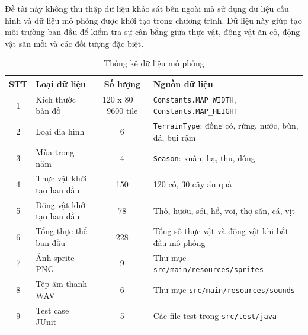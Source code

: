 \documentclass[12pt,a4paper]{article}
\begin{document}
Đề tài này không thu thập dữ liệu khảo sát bên ngoài mà sử dụng dữ liệu cấu hình và dữ liệu mô phỏng được khởi tạo trong chương trình. Dữ liệu này giúp tạo môi trường ban đầu để kiểm tra sự cân bằng giữa thực vật, động vật ăn cỏ, động vật săn mồi và các đối tượng đặc biệt.

\begin{table}[H]
    \centering
    \caption{Thống kê dữ liệu mô phỏng}
    \begin{tabular}{|c|p{5cm}|c|p{5cm}|}
        \hline
        \textbf{STT} & \textbf{Loại dữ liệu} & \textbf{Số lượng} & \textbf{Nguồn dữ liệu} \\
        \hline
        1 & Kích thước bản đồ & 120 x 80 = 9600 tile & \texttt{Constants.MAP\_WIDTH}, \texttt{Constants.MAP\_HEIGHT} \\
        \hline
        2 & Loại địa hình & 6 & \texttt{TerrainType}: đồng cỏ, rừng, nước, bùn, đá, bụi rậm \\
        \hline
        3 & Mùa trong năm & 4 & \texttt{Season}: xuân, hạ, thu, đông \\
        \hline
        4 & Thực vật khởi tạo ban đầu & 150 & 120 cỏ, 30 cây ăn quả \\
        \hline
        5 & Động vật khởi tạo ban đầu & 78 & Thỏ, hươu, sói, hổ, voi, thợ săn, cá, vịt \\
        \hline
        6 & Tổng thực thể ban đầu & 228 & Tổng số thực vật và động vật khi bắt đầu mô phỏng \\
        \hline
        7 & Ảnh sprite PNG & 9 & Thư mục \texttt{src/main/resources/sprites} \\
        \hline
        8 & Tệp âm thanh WAV & 6 & Thư mục \texttt{src/main/resources/sounds} \\
        \hline
        9 & Test case JUnit & 5 & Các file test trong \texttt{src/test/java} \\
        \hline
    \end{tabular}
\end{table}
\end{document}
